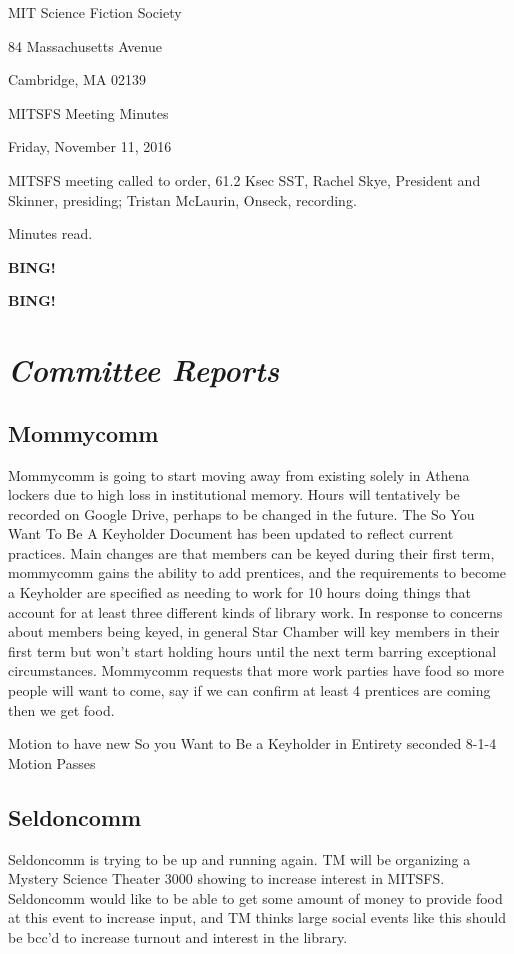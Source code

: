 \documentclass[10pt]{article}
\newcommand{\bing}{{\bf BING!} }
\newcommand{\goto}[1]{\bing \vskip 12pt \section*{{\em{#1}}}}
\newcommand{\skinner}{Rachel Skye, President and Skinner}
\newcommand{\onseck}{Tristan McLaurin, Onseck}
\newcommand{\meetingdate}{Friday, November 11, 2016}
\begin{document}
\begin{center}

MIT Science Fiction Society

84 Massachusetts Avenue

Cambridge, MA 02139

\vspace{12pt}

MITSFS Meeting Minutes

\meetingdate

\end{center}

\vspace{18pt}

\setlength{\parskip}{6pt}

\noindent
MITSFS meeting called to order, 61.2 Ksec SST,
\skinner, presiding; \onseck, recording.

Minutes read.

\bing

\goto{Committee Reports}
\subsection*{Mommycomm}
Mommycomm is going to start moving away from existing solely in Athena lockers due to high loss in institutional memory. Hours will tentatively be recorded on Google Drive, perhaps to be changed in the future.
The So You Want To Be A Keyholder Document has been updated to reflect current practices. Main changes are that members can be keyed during their first term, mommycomm gains the ability to add prentices, and the requirements to become a Keyholder are specified as needing to work for 10 hours doing things that account for at least three different kinds of library work.
In response to concerns about members being keyed, in general Star Chamber will key members in their first term but won't start holding hours until the next term barring exceptional circumstances.
Mommycomm requests that more work parties have food so more people will want to come, say if we can confirm at least 4 prentices are coming then we get food.

Motion to have new So you Want to Be a Keyholder in Entirety 
seconded
8-1-4
Motion Passes

 \subsection*{Seldoncomm}
Seldoncomm is trying to be up and running again. TM will be organizing a Mystery Science Theater 3000 showing to increase interest in MITSFS. Seldoncomm would like to be able to get some amount of money to provide food at this event to increase input, and TM thinks large social events like this should be bcc'd to increase turnout and interest in the library.
\end{document}

